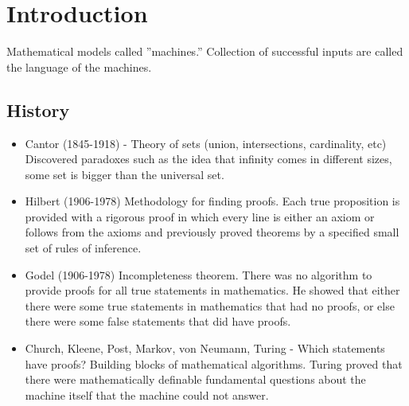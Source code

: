 \section{Introduction}
Mathematical models called ''machines.''
Collection of successful inputs are called the language of the machines.

\subsection{History}
\begin{itemize}
    \item Cantor (1845-1918) - Theory of sets (union, intersections, cardinality, etc) Discovered paradoxes such as the idea that infinity comes in different sizes, some set is bigger than the universal set.
    \item Hilbert (1906-1978) Methodology for finding proofs.
    Each true proposition is provided with a rigorous proof in which every line is either an axiom or follows from the axioms and previously proved theorems by a specified small set of rules of inference.
    \item Godel (1906-1978) Incompleteness theorem.
    There was no algorithm to provide proofs for all true statements in mathematics.
    He showed that either there were some true statements in mathematics that had no proofs, or else there were some false statements that did have proofs.
    \item Church, Kleene, Post, Markov, von Neumann, Turing - Which statements have proofs?
    Building blocks of mathematical algorithms.
    Turing proved that there were mathematically definable fundamental questions about the machine itself that the machine could not answer.
\end{itemize}

